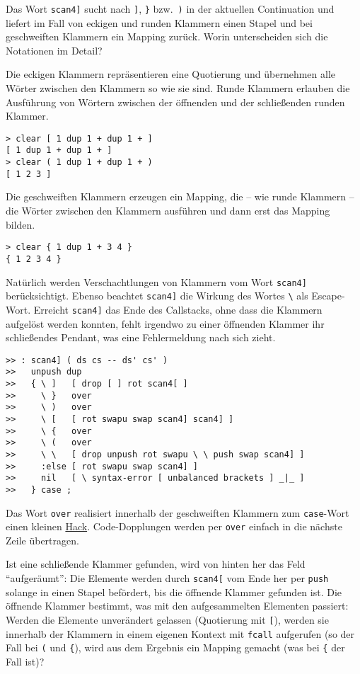 Das Wort \verb|scan4]| sucht nach \verb|]|, \verb|}| bzw.\ \verb|)| in der aktuellen Continuation und liefert im Fall von eckigen und runden Klammern einen Stapel und bei geschweiften Klammern ein Mapping zurück. Worin unterscheiden sich die Notationen im Detail?

Die eckigen Klammern repräsentieren eine Quotierung und übernehmen alle Wörter zwischen den Klammern so wie sie sind. Runde Klammern erlauben die Ausführung von Wörtern zwischen der öffnenden und der schließenden runden Klammer.

\begin{verbatim}
> clear [ 1 dup 1 + dup 1 + ]
[ 1 dup 1 + dup 1 + ]
> clear ( 1 dup 1 + dup 1 + )
[ 1 2 3 ]
\end{verbatim}

Die geschweiften Klammern erzeugen ein Mapping, die -- wie runde Klammern -- die Wörter zwischen den Klammern ausführen und dann erst das Mapping bilden.

\begin{verbatim}
> clear { 1 dup 1 + 3 4 }
{ 1 2 3 4 }
\end{verbatim}

Natürlich werden Verschachtlungen von Klammern vom Wort \verb|scan4]| berücksichtigt. Ebenso beachtet \verb|scan4]| die Wirkung des Wortes \verb|\| als Escape-Wort. Erreicht \verb|scan4]| das Ende des Callstacks, ohne dass die Klammern aufgelöst werden konnten, fehlt irgendwo zu einer öffnenden Klammer ihr schließendes Pendant, was eine Fehlermeldung nach sich zieht.

\begin{verbatim}
>> : scan4] ( ds cs -- ds' cs' )
>>   unpush dup
>>   { \ ]   [ drop [ ] rot scan4[ ]
>>     \ }   over
>>     \ )   over
>>     \ [   [ rot swapu swap scan4] scan4] ] 
>>     \ {   over
>>     \ (   over
>>     \ \   [ drop unpush rot swapu \ \ push swap scan4] ]
>>     :else [ rot swapu swap scan4] ]
>>     nil   [ \ syntax-error [ unbalanced brackets ] _|_ ]
>>   } case ;
\end{verbatim}

Das Wort \verb|over| realisiert innerhalb der geschweiften Klammern zum \verb|case|-Wort einen kleinen \href{http://de.wikipedia.org/wiki/Hack}{Hack}. Code-Dopplungen werden per \verb|over| einfach in die nächste Zeile übertragen.

Ist eine schließende Klammer gefunden, wird von hinten her das Feld "`aufgeräumt"': Die Elemente werden durch \verb|scan4[| vom Ende her per \verb|push| solange in einen Stapel befördert, bis die öffnende Klammer gefunden ist. Die öffnende Klammer bestimmt, was mit den aufgesammelten Elementen passiert: Werden die Elemente unverändert gelassen (Quotierung mit \verb|[|), werden sie innerhalb der Klammern in einem eigenen Kontext mit \verb|fcall| aufgerufen (so der Fall bei \verb|(| und \verb|{|), wird aus dem Ergebnis ein Mapping gemacht (was bei \verb|{| der Fall ist)?


